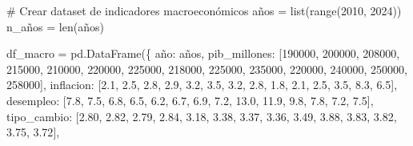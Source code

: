 \documentclass[
  doc,
  floatsintext,
  longtable,
  a4paper,
  nolmodern,
  notxfonts,
  notimes,
  12pt,
  colorlinks=true,linkcolor=blue,citecolor=blue,urlcolor=blue]{apa7}
\newenvironment{Shaded}{\begin{snugshade}}{\end{snugshade}}
\newcommand{\BuiltInTok}[1]{\textcolor[rgb]{0.00,0.23,0.31}{#1}}
\newcommand{\CommentTok}[1]{\textcolor[rgb]{0.37,0.37,0.37}{#1}}
\newcommand{\DecValTok}[1]{\textcolor[rgb]{0.68,0.00,0.00}{#1}}
\newcommand{\FloatTok}[1]{\textcolor[rgb]{0.68,0.00,0.00}{#1}}
\newcommand{\NormalTok}[1]{\textcolor[rgb]{0.00,0.23,0.31}{#1}}
\newcommand{\OperatorTok}[1]{\textcolor[rgb]{0.37,0.37,0.37}{#1}}
\newcommand{\StringTok}[1]{\textcolor[rgb]{0.13,0.47,0.30}{#1}}
\begin{document}
\begin{Shaded}
\begin{Highlighting}[]
\CommentTok{\# Crear dataset de indicadores macroeconómicos}
\NormalTok{años }\OperatorTok{=} \BuiltInTok{list}\NormalTok{(}\BuiltInTok{range}\NormalTok{(}\DecValTok{2010}\NormalTok{, }\DecValTok{2024}\NormalTok{))}
\NormalTok{n\_años }\OperatorTok{=} \BuiltInTok{len}\NormalTok{(años)}

\NormalTok{df\_macro }\OperatorTok{=}\NormalTok{ pd.DataFrame(\{}
    \StringTok{\textquotesingle{}año\textquotesingle{}}\NormalTok{: años,}
    \StringTok{\textquotesingle{}pib\_millones\textquotesingle{}}\NormalTok{: [}\DecValTok{190000}\NormalTok{, }\DecValTok{200000}\NormalTok{, }\DecValTok{208000}\NormalTok{, }\DecValTok{215000}\NormalTok{, }\DecValTok{210000}\NormalTok{, }\DecValTok{220000}\NormalTok{, }
                     \DecValTok{225000}\NormalTok{, }\DecValTok{218000}\NormalTok{, }\DecValTok{225000}\NormalTok{, }\DecValTok{235000}\NormalTok{, }\DecValTok{220000}\NormalTok{, }\DecValTok{240000}\NormalTok{, }
                     \DecValTok{250000}\NormalTok{, }\DecValTok{258000}\NormalTok{],}
    \StringTok{\textquotesingle{}inflacion\textquotesingle{}}\NormalTok{: [}\FloatTok{2.1}\NormalTok{, }\FloatTok{2.5}\NormalTok{, }\FloatTok{2.8}\NormalTok{, }\FloatTok{2.9}\NormalTok{, }\FloatTok{3.2}\NormalTok{, }\FloatTok{3.5}\NormalTok{, }\FloatTok{3.2}\NormalTok{, }\FloatTok{2.8}\NormalTok{, }\FloatTok{1.8}\NormalTok{, }\FloatTok{2.1}\NormalTok{, }
                  \FloatTok{2.5}\NormalTok{, }\FloatTok{3.5}\NormalTok{, }\FloatTok{8.3}\NormalTok{, }\FloatTok{6.5}\NormalTok{],}
    \StringTok{\textquotesingle{}desempleo\textquotesingle{}}\NormalTok{: [}\FloatTok{7.8}\NormalTok{, }\FloatTok{7.5}\NormalTok{, }\FloatTok{6.8}\NormalTok{, }\FloatTok{6.5}\NormalTok{, }\FloatTok{6.2}\NormalTok{, }\FloatTok{6.7}\NormalTok{, }\FloatTok{6.9}\NormalTok{, }\FloatTok{7.2}\NormalTok{, }\FloatTok{13.0}\NormalTok{, }\FloatTok{11.9}\NormalTok{, }
                  \FloatTok{9.8}\NormalTok{, }\FloatTok{7.8}\NormalTok{, }\FloatTok{7.2}\NormalTok{, }\FloatTok{7.5}\NormalTok{],}
    \StringTok{\textquotesingle{}tipo\_cambio\textquotesingle{}}\NormalTok{: [}\FloatTok{2.80}\NormalTok{, }\FloatTok{2.82}\NormalTok{, }\FloatTok{2.79}\NormalTok{, }\FloatTok{2.84}\NormalTok{, }\FloatTok{3.18}\NormalTok{, }\FloatTok{3.38}\NormalTok{, }\FloatTok{3.37}\NormalTok{, }\FloatTok{3.36}\NormalTok{, }
                    \FloatTok{3.49}\NormalTok{, }\FloatTok{3.88}\NormalTok{, }\FloatTok{3.83}\NormalTok{, }\FloatTok{3.82}\NormalTok{, }\FloatTok{3.75}\NormalTok{, }\FloatTok{3.72}\NormalTok{],}

\end{Highlighting}
\end{Shaded}
\end{document}
